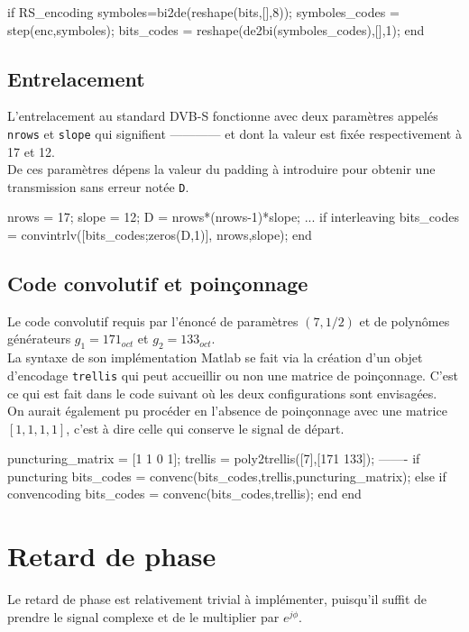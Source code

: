 \documentclass[a4paper,11pt]{article}
\begin{document}
\begin{lstun}
	if RS_encoding
		symboles=bi2de(reshape(bits,[],8));
		symboles_codes = step(enc,symboles);
		bits_codes = reshape(de2bi(symboles_codes),[],1);
	end
\end{lstun}

\subsection{Entrelacement}
L'entrelacement au standard DVB-S fonctionne avec deux paramètres appelés \texttt{nrows} et \texttt{slope} qui signifient ------------ et dont la valeur est fixée respectivement à 17 et 12. \\ De ces paramètres dépens la valeur du padding à introduire pour obtenir une transmission sans erreur notée \texttt{D}.

\begin{lstun}
	nrows = 17; slope = 12;
	D = nrows*(nrows-1)*slope;
	...
	if interleaving
	bits_codes = convintrlv([bits_codes;zeros(D,1)], nrows,slope);
	end
\end{lstun}

\subsection{Code convolutif et poinçonnage}
Le code convolutif requis par l'énoncé de paramètres $(7,1/2)$ et de polynômes générateurs $g_1=171_{oct}$ et  $g_2=133_{oct}$. \\
La syntaxe de son implémentation Matlab se fait via la création d'un objet d'encodage \texttt{trellis} qui peut accueillir ou non une matrice de poinçonnage. C'est ce qui est fait dans le code suivant où les deux configurations sont envisagées. \\
On aurait également pu procéder en l'absence de poinçonnage avec une matrice $[1,1,1,1]$, c'est à dire celle qui conserve le signal de départ.

\begin{lstun}
puncturing_matrix = [1 1 0 1];
trellis = poly2trellis([7],[171 133]);
-------
if puncturing
	bits_codes = convenc(bits_codes,trellis,puncturing_matrix);
else
if convencoding
	bits_codes = convenc(bits_codes,trellis);
end
end
\end{lstun}



\section{Retard de phase}
Le retard de phase est relativement trivial à implémenter, puisqu'il suffit de prendre le signal complexe et de le multiplier par $e^{j \phi}$. 
\end{document}
